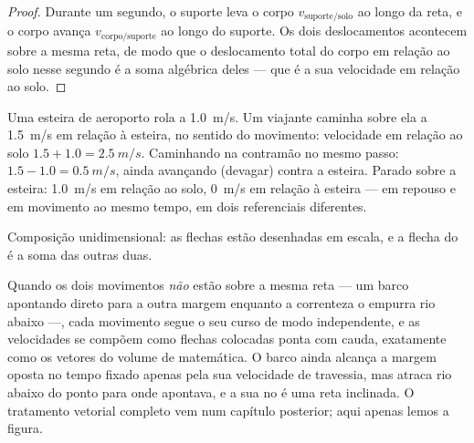 \begin{proof}
Durante um segundo, o suporte leva o corpo $v_{\text{suporte/solo}}$
 ao longo da reta, e o corpo avança $v_{\text{corpo/suporte}}$
 ao longo do suporte. Os dois deslocamentos acontecem sobre a mesma
reta, de modo que o deslocamento total do corpo em relação ao solo nesse
segundo é a soma algébrica deles --- que é a sua velocidade em relação ao
solo.
\end{proof}

\begin{example}\label{ex:g10:relative-motion:walkway}
Uma esteira de aeroporto rola a \qty{1.0}{m/s}. Um viajante caminha sobre
ela a \qty{1.5}{m/s} em relação à esteira, no sentido do movimento:
velocidade em relação ao solo $1.5 + 1.0 = \qty{2.5}{m/s}$. Caminhando na
contramão no mesmo passo: $1.5 - 1.0 = \qty{0.5}{m/s}$, ainda avançando
(devagar) contra a esteira. Parado sobre a esteira: \qty{1.0}{m/s} em
relação ao solo, \qty{0}{m/s} em relação à esteira --- em repouso e em
movimento ao mesmo tempo, em dois referenciais diferentes.
\end{example}

\begin{omfigure}

{\small Composição unidimensional: as flechas estão desenhadas em escala,
e a flecha do  é a soma das outras duas.}
\end{omfigure}

\begin{remark}\label{rem:g10:relative-motion:twodim}
Quando os dois movimentos \emph{não} estão sobre a mesma reta --- um
barco apontando direto para a outra margem enquanto a correnteza o empurra
rio abaixo ---, cada movimento segue o seu curso de modo independente, e
as velocidades se compõem como flechas colocadas ponta com cauda,
exatamente como os vetores do volume de matemática. O barco ainda alcança
a margem oposta no tempo fixado apenas pela sua velocidade de travessia,
mas atraca rio abaixo do ponto para onde apontava, e a sua  no
 é uma reta inclinada. O tratamento vetorial completo
vem num capítulo posterior; aqui apenas lemos a figura.
\end{remark}

